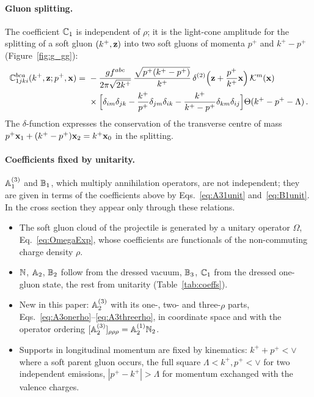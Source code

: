 \paragraph{Gluon splitting.} The coefficient $\mathbb{C}_1$ is independent of $\rho$; it is the light-cone amplitude for the splitting of a soft gluon $(k^+,\mathbf{z})$ into two soft gluons of momenta $p^+$ and $k^+-p^+$ (Figure~\ref{fig:g_gg}):
\begin{align}\label{eq:C1}
\mf C^{bca}_{1jki}(k^+,\v z;p^+,\v x)=\ &-\frac{gf^{abc}}{2\pi\sqrt{2k^+}}\,\frac{\sqrt{p^+(k^+-p^+)}}{k^+}\,\delta^{(2)}\Big(\v z+\frac{p^+}{k^+}\v x\Big)\,\Kv^m(\v x)
\notag\\&\times\Big[\delta_{im}\delta_{jk}-\frac{k^+}{p^+}\delta_{jm}\delta_{ik}-\frac{k^+}{k^+-p^+}\delta_{km}\delta_{ij}\Big]\Theta(k^+-p^+-\Lambda)\,.
\end{align}
The $\delta$-function expresses the conservation of the transverse centre of mass $p^+\mathbf{x}_1+(k^+-p^+)\mathbf{x}_2=k^+\mathbf{x}_0$ in the splitting.

\paragraph{Coefficients fixed by unitarity.} $\mathbb{A}^{(3)}_1$ and $\mathbb{B}_1$, which multiply annihilation operators, are not independent; they are given in terms of the coefficients above by Eqs.~\eqref{eq:A31unit} and~\eqref{eq:B1unit}. In the cross section they appear only through these relations.

\begin{summarybox}
\begin{itemize}
\item The soft gluon cloud of the projectile is generated by a unitary operator $\Omega$, Eq.~\eqref{eq:OmegaExp}, whose coefficients are functionals of the non-commuting charge density $\rho$.
\item $\mathbb{N}$, $\mathbb{A}_2$, $\mathbb{B}_2$ follow from the dressed vacuum, $\mathbb{B}_3$, $\mathbb{C}_1$ from the dressed one-gluon state, the rest from unitarity (Table~\ref{tab:coeffs}).
\item New in this paper: $\mathbb{A}^{(3)}_2$ with its one-, two- and three-$\rho$ parts, Eqs.~\eqref{eq:A3onerho}--\eqref{eq:A3threerho}, in coordinate space and with the operator ordering $[\mathbb{A}^{(3)}_2]_{\rho\rho\rho}=\mathbb{A}^{(1)}_2\mathbb{N}_2$.
\item Supports in longitudinal momentum are fixed by kinematics: $k^++p^+<\vee$ where a soft parent gluon occurs, the full square $\Lambda<k^+,p^+<\vee$ for two independent emissions, $|p^+-k^+|>\Lambda$ for momentum exchanged with the valence charges.
\end{itemize}
\end{summarybox}
